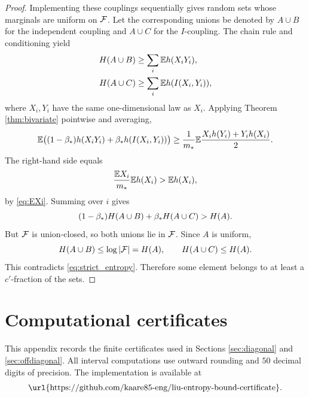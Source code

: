 \begin{proof}
Implementing these couplings sequentially gives random sets whose marginals are uniform on \(\mathcal{F}\).  Let the corresponding unions be denoted by \(A\cup B\) for the independent coupling and \(A\cup C\) for the \(I\)-coupling.  The chain rule and conditioning yield
\begin{align}\label{eq:entropy_union_lower}
  H(A\cup B)&\ge \sum_i \mathbb{E} h(X_iY_i),\notag\\
  H(A\cup C)&\ge \sum_i \mathbb{E} h(I(X_i,Y_i)),
\end{align}
where \(X_i,Y_i\) have the same one-dimensional law as \(X_i\).  Applying Theorem \ref{thm:bivariate} pointwise and averaging,
\begin{equation}\label{eq:entropy_pointwise_avg}
  \mathbb{E}\bigl((1-\beta_*)h(X_iY_i)+\beta_* h(I(X_i,Y_i))\bigr)
  \ge
  \frac{1}{m_*}\mathbb{E}\frac{X_i h(Y_i)+Y_i h(X_i)}2.
\end{equation}
The right-hand side equals
\begin{equation}\label{eq:factor_avg}
  \frac{\mathbb{E} X_i}{m_*}\mathbb{E} h(X_i)>\mathbb{E} h(X_i),
\end{equation}
by \eqref{eq:EXi}.  Summing over \(i\) gives
\begin{equation}\label{eq:strict_entropy}
  (1-\beta_*)H(A\cup B)+\beta_* H(A\cup C)>H(A).
\end{equation}
But \(\mathcal{F}\) is union-closed, so both unions lie in \(\mathcal{F}\).  Since \(A\) is uniform,
\begin{equation}\label{eq:entropy_upper_union}
  H(A\cup B)\le\log|\mathcal{F}|=H(A),
  \qquad
  H(A\cup C)\le H(A).
\end{equation}
This contradicts \eqref{eq:strict_entropy}.  Therefore some element belongs to at least a \(c'\)-fraction of the sets.
\end{proof}


\appendix
\section{Computational certificates}\label{app:certificates}

This appendix records the finite certificates used in Sections
\ref{sec:diagonal} and \ref{sec:offdiagonal}.  All interval computations use
outward rounding and \(50\) decimal digits of precision.  The implementation is
available at
\begin{equation}\label{eq:code_url}
  \text{\url{https://github.com/kaare85-eng/liu-entropy-bound-certificate}}.
\end{equation}

